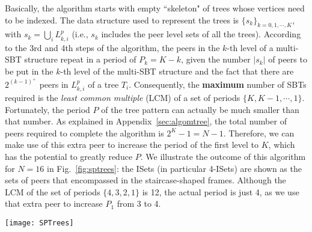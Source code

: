 \documentclass[conference]{IEEEtran}
\begin{document}
  Basically, the algorithm starts with empty ``skeleton" of trees whose vertices need to be indexed. The data structure used to represent the trees is $\{s_k\}_{k=0,1,\cdots,K}$, with $s_k = \bigcup_i L^p_{k,i}$ (i.e., $s_k$ includes the peer level sets of all the trees). According to the 3rd and 4th steps of the algorithm, the peers in the $k$-th level of a multi-SBT structure repeat in a  period of $P_k = K-k$, given the number $|s_k|$ of peers to be put in the $k$-th level of the multi-SBT structure and the fact that there are $2^{(k-1)^+}$ peers in $L^p_{k,i}$ of a tree $T_i$. Consequently, the \textbf{maximum} number of SBTs required is the \textit{least common multiple} (LCM) of a set of periods $\{K, K-1, \cdots, 1\}$. Fortunately, the period $P$ of the tree pattern can actually be much smaller than that number. As explained in Appendix~\ref{sec:algomtree}, the total number of peers required to complete the algorithm is $2^K-1=N-1$. Therefore, we can make use of this extra peer to increase the period of the first level to $K$, which has the potential to greatly reduce $P$. We illustrate the outcome of this algorithm for $N=16$ in Fig.~\ref{fig:sptrees}: the ISets (in particular 4-ISets) are shown as the sets of peers that encompassed in the staircase-shaped frames. Although the LCM of the set of periods $\{4,3,2,1\}$ is 12, the actual period is just 4, as we use that extra peer to increase $P_1$ from 3 to 4.
\begin{figure*}[t]
   \begin{center}
        \texttt{[image: SPTrees]}
    \caption{The multi-SBT structure, $K$-ISet, and corresponding uploading schedules for $N=16$. The correspondence between an SBT and the scheduled uploadings below it is such that these concurrent uploadings take place exactly when the server pushes a chunk to the root of this tree.} \label{fig:sptrees}
   \end{center}
  \end{figure*}
\end{document}
